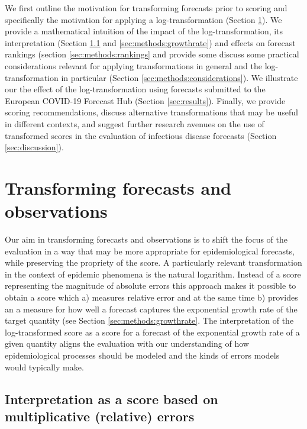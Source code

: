 \documentclass{article}
\begin{document}
We first outline the motivation for transforming forecasts prior to scoring and specifically the motivation for applying a log-transformation (Section \ref{sec:methods}). We provide a mathematical intuition of the impact of the log-transformation, its interpretation (Section \ref{sec:methods:relative} and \ref{sec:methods:growthrate}) and effects on forecast rankings (section \ref{sec:methods:rankings} and provide some discuss some practical considerations relevant for applying transformations in general and the log-transformation in particular (Section \ref{sec:methods:considerations}). We illustrate our the effect of the log-transformation using forecasts submitted to the European COVID-19 Forecast Hub  \citep{europeancovid-19forecasthubEuropeanCovid19Forecast2021, sherrattPredictivePerformanceMultimodel2022} (Section \ref{sec:results}). Finally, we provide scoring recommendations, discuss alternative transformations that may be useful in different contexts, and suggest further research avenues on the use of transformed scores in the evaluation of infectious disease forecasts (Section \ref{sec:discussion}). 


\section{Transforming forecasts and observations}
\label{sec:methods}

Our aim in transforming forecasts and observations is to shift the focus of the evaluation in a way that may be more appropriate for epidemiological forecasts, while preserving the propriety of the score. A particularly relevant transformation in the context of epidemic phenomena is the natural logarithm. Instead of a score representing the magnitude of absolute errors this approach makes it possible to obtain a score which a) measures relative error and at the same time b) provides an a measure for how well a forecast captures the exponential growth rate of the target quantity (see Section \ref{sec:methods:growthrate}. The interpretation of the log-transformed score as a score for a forecast of the exponential growth rate of a given quantity aligns the evaluation with our understanding of how epidemiological processes should be modeled and the kinds of errors models would typically make. 


\subsection{Interpretation as a score based on multiplicative (relative) errors}
\label{sec:methods:relative}
\end{document}
